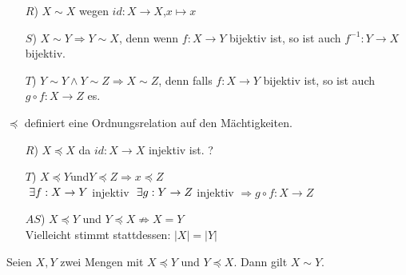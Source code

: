 \documentclass[main.tex]{subfiles}
\begin{document}
\begin{Beweis}
  \begin{itemize}
    \item[$R$)] $X\sim X$ wegen $id: X\to X$,$x\mapsto x$
    \item[$S$)] $X \sim Y \Rightarrow Y \sim X$, denn wenn $f:X \to Y$ bijektiv ist, so ist auch $f^{-1}: Y \to X$ bijektiv.
    \item[$T$)] $Y \sim Y \land Y \sim Z \Rightarrow X \sim Z$, denn falls $f: X\to Y$ bijektiv ist, so ist auch $g\circ f : X \to Z$ es.
  \end{itemize}
\end{Beweis}

\begin{Theorem}
  $\preccurlyeq$ definiert eine Ordnungsrelation auf den Mächtigkeiten.
\end{Theorem}

\begin{Beweis}
  \begin{itemize}
    \item[$R$)] $X \preccurlyeq X$ da $id: X \to X$ injektiv ist. ?
    \item[$T$)] $X \preccurlyeq Y $und$ Y \preccurlyeq Z \Rightarrow x \preccurlyeq Z$\\
    $\;\exists f: X \to Y$ injektiv   $\;\exists g: Y\to Z$ injektiv $\Rightarrow g\circ f : X\to Z$
    \item[$AS$)] $X \preccurlyeq Y$ und $Y \preccurlyeq X \not\Rightarrow X = Y$\\
    Vielleicht stimmt stattdessen: $|X| = |Y|$
  \end{itemize}
\end{Beweis}

\begin{Theorem}
  Seien $X,Y$ zwei Mengen mit $X \preccurlyeq Y$ und $Y \preccurlyeq X$. Dann gilt $X \sim Y$.
\end{Theorem}
\end{document}
